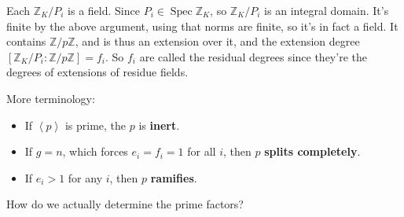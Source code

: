 \begin{observation}

Each \({\mathbb{Z}}_K/P_i\) is a field. Since
\(P_i \in \operatorname{Spec}{\mathbb{Z}}_K\), so \({\mathbb{Z}}_K/P_i\)
is an integral domain. It's finite by the above argument, using that
norms are finite, so it's in fact a field. It contains
\({\mathbb{Z}}/p{\mathbb{Z}}\), and is thus an extension over it, and
the extension degree
\([{\mathbb{Z}}_K/P_i: {\mathbb{Z}}/p{\mathbb{Z}}] = f_i\). So \(f_i\)
are called the residual degrees since they're the degrees of extensions
of residue fields.

\end{observation}

\begin{definition}

More terminology:

\begin{itemize}
\tightlist
\item
  If \(\left\langle{ p }\right\rangle\) is prime, the \(p\) is
  \textbf{inert}.
\item
  If \(g=n\), which forces \(e_i = f_i = 1\) for all \(i\), then \(p\)
  \textbf{splits completely}.
\item
  If \(e_i > 1\) for any \(i\), then \(p\) \textbf{ramifies}.
\end{itemize}

\end{definition}

\begin{remark}

How do we actually determine the prime factors?

\end{remark}

